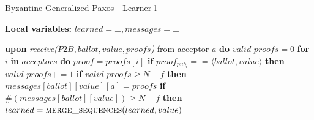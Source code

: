 \documentclass[algorithms,article,accept,moreauthors,pdftex,10pt,a4paper]{Definitions/mdpi}
\begin{document}
\begin{algorithm}[H]
\caption{Byzantine Generalized Paxos---Learner l}
\label{BFT-Learn}
\textbf{Local variables:} $learned = \bot, messages = \bot$
\begin{algorithmic}[1] 
\State \textbf{upon} \textit{receive($P2B, ballot, value, proofs$)} from acceptor $a$ \textbf{do}
\State \hspace{\algorithmicindent} $valid\_proofs = 0$
\State \hspace{\algorithmicindent} \textbf{for} $i$ \textbf{in} $acceptors$ \textbf{do}
\State \hspace{\algorithmicindent}\hspace{\algorithmicindent} $proof = proofs[i]$
\State \hspace{\algorithmicindent}\hspace{\algorithmicindent} \textbf{if} $proof_{pub_i} == \langle ballot, value \rangle$ \textbf{then}
\State \hspace{\algorithmicindent}\hspace{\algorithmicindent}\hspace{\algorithmicindent} 
$valid\_proofs \mathrel{+{=}} 1$
\State
\State \hspace{\algorithmicindent} \textbf{if} $valid\_proofs \geq N-f$ \textbf{then}
\State \hspace{\algorithmicindent}\hspace{\algorithmicindent} $messages[ballot][value][a] = proofs$
\State
\State \hspace{\algorithmicindent}\hspace{\algorithmicindent} \textbf{if} $\#(messages[ballot][value]) \geq N-f$ \textbf{then}
\State \hspace{\algorithmicindent}\hspace{\algorithmicindent}\hspace{\algorithmicindent} $learned = \Call{merge\_sequences}{learned, value}$


\end{algorithmic}
\end{algorithm}
\end{document}
